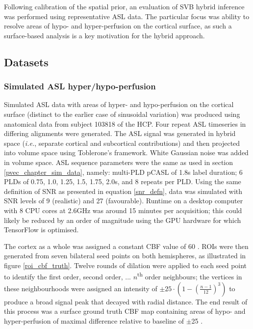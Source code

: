 Following calibration of the spatial prior, an evaluation of SVB hybrid inference was performed using representative ASL data. The particular focus was ability to resolve areas of hypo- and hyper-perfusion on the cortical surface, as such a surface-based analysis is a key motivation for the hybrid approach. 

\subsection{Datasets}

\subsubsection{Simulated ASL hyper/hypo-perfusion}

Simulated ASL data with areas of hyper- and hypo-perfusion on the cortical surface (distinct to the earlier case of sinusoidal variation) was produced using anatomical data from subject 103818 of the HCP. Four repeat ASL timeseries in differing alignments were generated. The ASL signal was generated in hybrid space (\textit{i.e.}, separate cortical and subcortical contributions) and then projected into volume space using Toblerone's framework. White Gaussian noise was added in volume space. ASL sequence parameters were the same as used in section \ref{pvec_chapter_sim_data}, namely: multi-PLD pCASL of 1.8s label duration; 6 PLDs of 0.75, 1.0, 1.25, 1.5, 1.75, 2.0s, and 8 repeats per PLD. Using the same definition of SNR as presented in equation \ref{snr_defn}, data was simulated with SNR levels of 9 (realistic) and 27 (favourable). Runtime on a desktop computer with 8 CPU cores at 2.6GHz was around 15 minutes per acquisition; this could likely be reduced by an order of magnitude using the GPU hardware for which TensorFlow is optimised. 

The cortex as a whole was assigned a constant CBF value of 60 \cbf. ROIs were then generated from seven bilateral seed points on both hemispheres, as illustrated in figure \ref{roi_cbf_truth}. Twelve rounds of dilation were applied to each seed point to identify the first order, second order, ... $n$\textsuperscript{th} order neighbours; the vertices in these neighbourhoods were assigned an intensity of $\pm25 \cdot (1 - (\frac{n-1}{12})^3)$ to produce a broad signal peak that decayed with radial distance. The end result of this process was a surface ground truth CBF map containing areas of hypo- and hyper-perfusion of maximal difference relative to baseline of $\pm$25 \cbf. 

